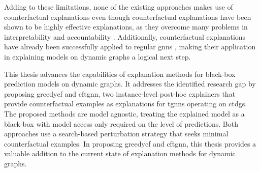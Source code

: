 Adding to these limitations, none of the existing approaches makes use of counterfactual explanations even though counterfactual explanations have been shown to be highly effective explanations, as they overcome many problems in interpretability and accountability \cite{wachter_counterfactual_2018}. Additionally, counterfactual explanations have already been successfully applied to regular \glspl{gnn} \cite{tan_learning_2022, lucic_cf-gnnexplainer_2022}, making their application in explaining models on dynamic graphs a logical next step.

This thesis advances the capabilities of explanation methods for black-box prediction models on dynamic graphs. It addresses the identified research gap by proposing \gls{greedycf} and \gls{cftgnn}, two instance-level post-hoc explainers that provide counterfactual examples as explanations for \glspl{tgnn} operating on \glspl{ctdg}. The proposed methods are model agnostic, treating the explained model as a black-box with model access only required on the level of predictions. Both approaches use a search-based perturbation strategy that seeks minimal counterfactual examples. In proposing \gls{greedycf} and \gls{cftgnn}, this thesis provides a valuable addition to the current state of explanation methods for dynamic graphs.


